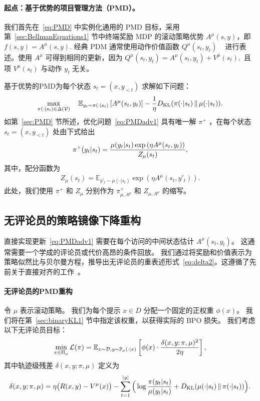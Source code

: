 \documentclass[11pt]{article}
\theoremstyle{definition}
\def\eq#1{\begin{equation*}\begin{split}#1\end{split}\end{equation*}}
\def\eql#1#2{\begin{equation}{#1}\begin{split}#2\end{split}\end{equation}}
\def\pr#1{\left( #1 \right ) }
\def\br#1{\left[ #1 \right ] }
\def\calD{\mathcal{D}}
\def\calL{\mathcal{L}}
\def\prb#1{\big( #1 \big)}
\def\prB#1{\Big( #1 \Big)}
\def\KL#1#2{D_{\mathrm{KL}}(#1 \,\Vert\, #2)}
\newcommand\Eb{\mathbb{E}}
\newcommand\cmu{\mathbb{P}_{\mu}}
\begin{document}
\paragraph{起点：基于优势的项目管理方法（PMD）。}
我们首先在~\eqref{eq:PMD} 中实例化通用的 PMD 目标，采用第~\ref{sec:BellmanEquations1} 节中终端奖励 MDP 的滚动策略优势 $A^{\mu}(s, y)$，即  
$
    f(s,y)=A^\mu(s,y).  
$  
经典 PDM 通常使用动作价值函数 $Q^\mu(s_t, y_t)$ ~\cite{geist2019theory,lan2023policy,xiao2022convergence,tomar2020mirror} 进行表述。使用 $A^\mu$ 可得到相同的更新，因为  
$
    Q^\mu(s_t, y_t)=A^\mu(s_t, y_t)+V^\mu(s_t),
$  
且项 $V^\mu(s_t)$ 与动作 $y_t$ 无关。 

基于优势的PMD为每个状态 $s_t = (x, y_{<t})$ 求解如下问题：
\eql{\label{eq:PMDadv1}}{
    \max_{\pi(\cdot | s_t)\in \Delta(\mathcal{V})} \quad \Eb_{y_t\sim \pi(\cdot| s_t)}\br{A^{\mu}(s_t, y_t)} - \frac{1}{\eta} {\KL{\pi(\cdot| s_t)}{\mu(\cdot | s_t)}}.                       
} 
如第~\ref{sec:PMD} 节所述，优化问题~\eqref{eq:PMDadv1} 具有唯一解 $\pi^+$ ，在每个状态 $s_t = (x, y_{<t})$ 处由下式给出
\eql{\label{eq:piexpwadv1}}{
    \pi^+(y_t|s_t) = \frac{\mu(y_t|s_t)\exp\pr{\eta A^{\mu}(s_t, y_t)}}{Z_{\mu}(s_t) },
}
其中，配分函数为
\eq{
    Z_{\mu}(s_t) = \Eb_{y'_t\sim \mu(\cdot|s_t)} \exp\pr{\eta A^{\mu}(s_t, y'_t)}.
}
此处，我们使用 $\pi^+$  和 $Z_{\mu}$  分别作为 $\pi^+_{\mu, A^{\mu}}$  和 $Z_{\mu, A^{\mu}}$ 的缩写。  

\subsection{无评论员的策略镜像下降重构}\label{sec:criticfreePMD}
直接实现更新~\eqref{eq:PMDadv1} 需要在每个访问的中间状态估计 $A^\mu(s_t,y_t)$。  
这通常需要一个学成的评论员或代价高昂的条件回放。  
我们通过将奖励和价值表示为策略似然比与贝尔曼方程，推导出无评论员的重表述形式~\eqref{eq:delta2}。这遵循了先前关于直接对齐的工作~\cite{rafailov2023direct,zeng2024token,rafailovr,kang2026vimpo}。 

\paragraph{无评论员的PMD重构}
令 $\mu$ 表示滚动策略。  
我们为每个提示 $x\in D$ 分配一个固定的正权重 $\phi(x)$。  
我们将在第~\ref{sec:binaryKL1} 节中指定该权重，以获得实际的 BPO 损失。  
我们考虑以下无评论员目标：  
\eql{\label{eq:delta2}}{
    \min_{\pi\in\Pi_\mu}
    \calL(\pi) = 
    \Eb_{x\sim \calD, y\sim\cmu(\cdot|x)}\br{\phi(x) \cdot \frac{\delta(x,y;\pi,\mu)^2}{2 \eta             }},   
}  
其中轨迹级残差 $\delta(x, y; \pi, \mu)$ 定义为  
\eql{\label{eq:deltadef1}}{
    \delta(x, y; \pi, \mu) = \eta \prb{R(x, y) - V^{\mu}(x)} - \sum_{t=1}^{|y|} \prB{\log\frac{\pi(y_t | s_t)}{\mu(y_t | s_t)} + \KL{\mu(\cdot | s_t)}{\pi(\cdot | s_t)}}.   
}
\end{document}
